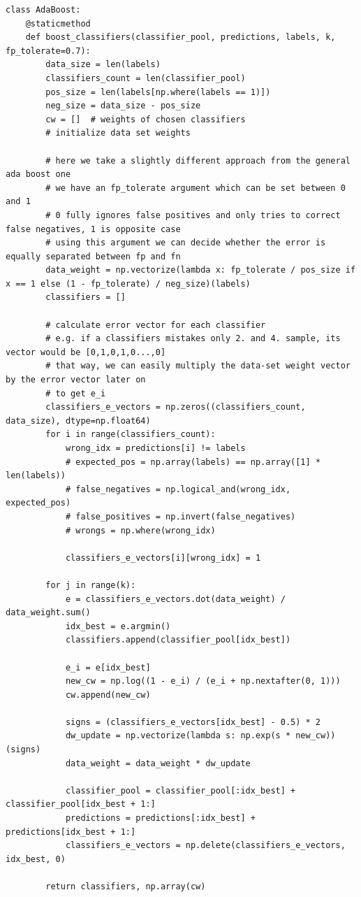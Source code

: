 \begin{lstlisting}[style=py]
class AdaBoost:
    @staticmethod
    def boost_classifiers(classifier_pool, predictions, labels, k, fp_tolerate=0.7):
        data_size = len(labels)
        classifiers_count = len(classifier_pool)
        pos_size = len(labels[np.where(labels == 1)])
        neg_size = data_size - pos_size
        cw = []  # weights of chosen classifiers
        # initialize data set weights

        # here we take a slightly different approach from the general ada boost one
        # we have an fp_tolerate argument which can be set between 0 and 1
        # 0 fully ignores false positives and only tries to correct false negatives, 1 is opposite case
        # using this argument we can decide whether the error is equally separated between fp and fn
        data_weight = np.vectorize(lambda x: fp_tolerate / pos_size if x == 1 else (1 - fp_tolerate) / neg_size)(labels)
        classifiers = []

        # calculate error vector for each classifier
        # e.g. if a classifiers mistakes only 2. and 4. sample, its vector would be [0,1,0,1,0...,0]
        # that way, we can easily multiply the data-set weight vector by the error vector later on
        # to get e_i
        classifiers_e_vectors = np.zeros((classifiers_count, data_size), dtype=np.float64)
        for i in range(classifiers_count):
            wrong_idx = predictions[i] != labels
            # expected_pos = np.array(labels) == np.array([1] * len(labels))
            # false_negatives = np.logical_and(wrong_idx, expected_pos)
            # false_positives = np.invert(false_negatives)
            # wrongs = np.where(wrong_idx)

            classifiers_e_vectors[i][wrong_idx] = 1

        for j in range(k):
            e = classifiers_e_vectors.dot(data_weight) / data_weight.sum()
            idx_best = e.argmin()
            classifiers.append(classifier_pool[idx_best])

            e_i = e[idx_best]
            new_cw = np.log((1 - e_i) / (e_i + np.nextafter(0, 1)))
            cw.append(new_cw)

            signs = (classifiers_e_vectors[idx_best] - 0.5) * 2
            dw_update = np.vectorize(lambda s: np.exp(s * new_cw))(signs)
            data_weight = data_weight * dw_update

            classifier_pool = classifier_pool[:idx_best] + classifier_pool[idx_best + 1:]
            predictions = predictions[:idx_best] + predictions[idx_best + 1:]
            classifiers_e_vectors = np.delete(classifiers_e_vectors, idx_best, 0)

        return classifiers, np.array(cw)
\end{lstlisting}

